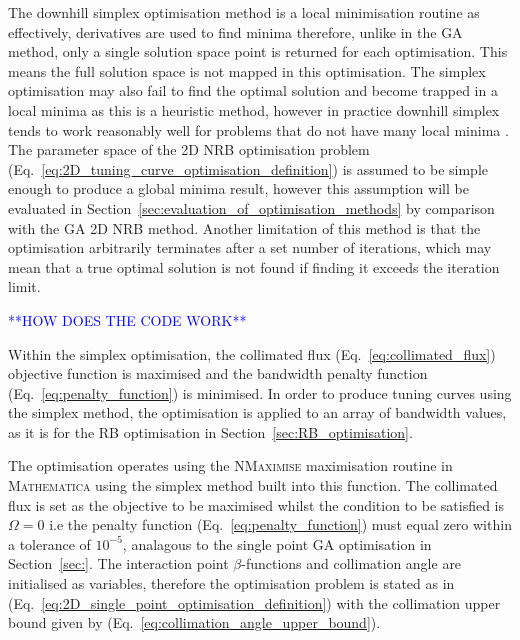 \documentclass[../main.tex]{subfiles}
\begin{document}
The downhill simplex optimisation method is a local minimisation routine as effectively, derivatives are used to find minima \cite{jones2016design} therefore, unlike in the GA method, only a single solution space point is returned for each optimisation. This means the full solution space is not mapped in this optimisation. The simplex optimisation may also fail to find the optimal solution and become trapped in a local minima as this is a heuristic method, however in practice downhill simplex tends to work reasonably well for problems that do not have many local minima \cite{wolfram2021nmaximize}. The parameter space of the 2D NRB optimisation problem (Eq.~\ref{eq:2D_tuning_curve_optimisation_definition}) is assumed to be simple enough to produce a global minima result, however this assumption will be evaluated in Section~\ref{sec:evaluation_of_optimisation_methods} by comparison with the GA 2D NRB method. Another limitation of this method is that the optimisation arbitrarily terminates after a set number of iterations, which may mean that a true optimal solution is not found if finding it exceeds the iteration limit.

\textcolor{blue}{**HOW DOES THE CODE WORK**}

Within the simplex optimisation, the collimated flux (Eq.~\ref{eq:collimated_flux}) objective function is maximised and the bandwidth penalty function (Eq.~\ref{eq:penalty_function}) is minimised. In order to produce tuning curves using the simplex method, the optimisation is applied to an array of bandwidth values, as it is for the RB optimisation in Section~\ref{sec:RB_optimisation}.

The optimisation operates using the \textsc{NMaximise} maximisation routine in \textsc{Mathematica} \cite{wolfram2021nmaximize} using the simplex method built into this function. The collimated flux is set as the objective to be maximised whilst the condition to be satisfied is $\Omega = 0$ i.e the penalty function (Eq.~\ref{eq:penalty_function}) must equal zero within a tolerance of $10^{-5}$, analagous to the single point GA optimisation in Section~\ref{sec:}. The interaction point $\beta$-functions and collimation angle are initialised as variables, therefore the optimisation problem is stated as in (Eq.~\ref{eq:2D_single_point_optimisation_definition}) with the collimation upper bound given by (Eq.~\ref{eq:collimation_angle_upper_bound}).
\end{document}
